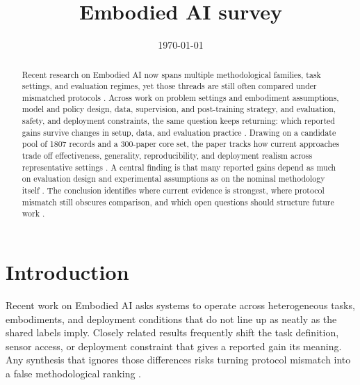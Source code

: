\documentclass[a4paper,11pt]{article}
\title{Embodied AI survey}
\author{}
\date{\today}
\begin{document}
\maketitle

\tableofcontents
\newpage

\begin{abstract}


Recent research on Embodied AI now spans multiple methodological families, task settings, and evaluation regimes, yet those threads are still often compared under mismatched protocols \citep{Fan2025Interleave,Shao2025Large,Gundawar2025Bench,Kim2026Molmospaces,Din2025Vision,Zheng2024Survey}. Across work on problem settings and embodiment assumptions, model and policy design, data, supervision, and post-training strategy, and evaluation, safety, and deployment constraints, the same question keeps returning: which reported gains survive changes in setup, data, and evaluation practice \citep{Zhu2025Objectvla,Doshi2024Scaling,Bu2025Univla,Bai2025Towards,Zhou2025Autoeval,Dai2026Conla}. Drawing on a candidate pool of 1807 records and a 300-paper core set, the paper tracks how current approaches trade off effectiveness, generality, reproducibility, and deployment realism across representative settings \citep{Jiang2025Behavior,Eze2024Learning,Kachaev2025Mind,Xu2025Aerial,Wu2024Discrete,Lin2025Echovla}. A central finding is that many reported gains depend as much on evaluation design and experimental assumptions as on the nominal methodology itself \citep{Shi2025Diversity,Mandi2022Cacti,Wu2025Moto,Awais2023Foundational,Bai2025Embodied,Black2024Vision}. The conclusion identifies where current evidence is strongest, where protocol mismatch still obscures comparison, and which open questions should structure future work \citep{Brohan2023Vision,Bucker2024Grappa,Chen2021Learning,Chen2025Internvla,Chen2025Once,Cui2025Openhelix}.

\end{abstract}

\section{Introduction}


Recent work on Embodied AI asks systems to operate across heterogeneous tasks, embodiments, and deployment conditions that do not line up as neatly as the shared labels imply. Closely related results frequently shift the task definition, sensor access, or deployment constraint that gives a reported gain its meaning. Any synthesis that ignores those differences risks turning protocol mismatch into a false methodological ranking \citep{Fan2025Interleave,Shao2025Large,Gundawar2025Bench,Kim2026Molmospaces,Din2025Vision,Zheng2024Survey}.
\end{document}
